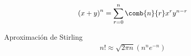 {}
\begin{thm}
 \begin{align}
  \label{eq:0.1.32}
  \left( x+y \right)^{n} = \sum_{r=0}^{n}\comb{n}{r}x^{r}y^{n-r}
 \end{align}

\end{thm}


{Aproximación de Stirling}
\begin{align}
 \label{eq:0.1.33}
 n! \approx \sqrt{2\pi n}\left( n^{n}e^{-n} \right)
\end{align}


% 
% 
%
% 
%
% 
% 
%

